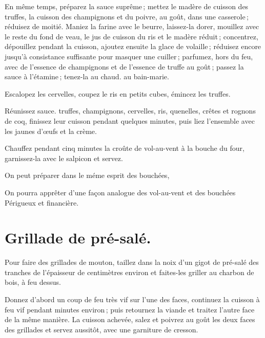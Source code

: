 \label{pg0510} \hypertarget{p0510}{}
En même temps, préparez la sauce suprême ; mettez le madère de cuisson des
truffes, la cuisson des champignons et du poivre, au goût, dans une casserole ;
réduisez de moitié. Maniez la farine avec le beurre, laissez-la dorer, mouillez
avec le reste du fond de veau, le jus de cuisson du ris et le madère réduit ;
concentrez, dépouillez pendant la cuisson, ajoutez ensuite la glace de
volaille ; réduisez encore jusqu'à consistance suffisante pour masquer une
cuiller ; parfumez, hors du feu, avec de l'essence de champignons et de
l'essence de truffe au goût ; passez la sauce à l'étamine ; tenez-la au chaud.
au bain-marie.

Escalopez les cervelles, coupez le ris en petits cubes, émincez les truffes.

Réunissez sauce. truffes, champignons, cervelles, ris, quenelles, crêtes et
rognons de coq, finissez leur cuisson pendant quelques minutes, puis liez
l'ensemble avec les jaunes d'œufs et la crème.

Chauffez pendant cinq minutes la croûte de vol-au-vent à la bouche du four,
garnissez-la avec le salpicon et servez.

\sk

On peut préparer dans le méme esprit des bouchées,

\sk

On pourra apprêter d'une façon analogue des vol-au-vent et des bouchées
Périgueux et financière.

\section*{\centering Grillade de pré-salé.}
{}

Pour faire des grillades de mouton, taillez dans la noix d'un gigot de pré-salé
des tranches de l'épaisseur de {\mmm} centimètres environ et faites-les griller au
charbon de bois, à feu dessus.

Donnez d'abord un coup de feu très vif sur l'une des faces, continuez la cuisson
à feu vif pendant {\mmm} minutes environ ; puis retournez la viande et traitez l'autre
face de la même manière. La cuisson achevée, salez et poivrez au goût les deux
faces des grillades et servez aussitôt, avec une garniture de cresson.


